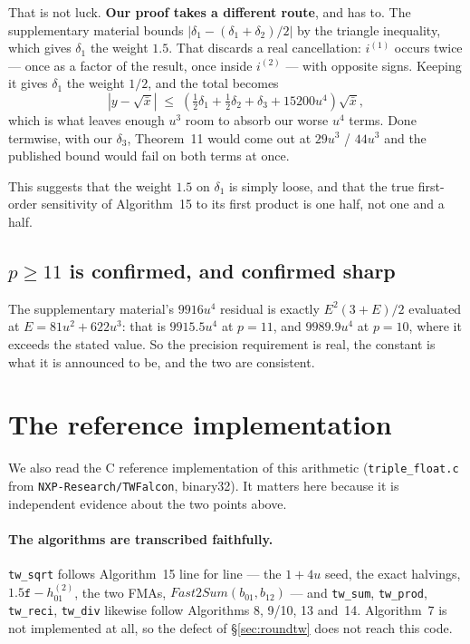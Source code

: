 \documentclass[11pt,a4paper]{article}
\newcommand{\alg}[1]{\mathit{#1}}
\begin{document}
That is not luck. \textbf{Our proof takes a different route}, and has to. The
supplementary material bounds $|\delta_1 - (\delta_1+\delta_2)/2|$ by the
triangle inequality, which gives $\delta_1$ the weight $1.5$. That discards a
real cancellation: $i^{(1)}$ occurs twice --- once as a factor of the result,
once inside $i^{(2)}$ --- with opposite signs. Keeping it gives $\delta_1$ the
weight $1/2$, and the total becomes
\[
  \left|y - \sqrt{\bar x}\right| \;\leq\;
  \left(\tfrac12\delta_1 + \tfrac12\delta_2 + \delta_3 + 15200u^4\right)
  \sqrt{\bar x},
\]
which is what leaves enough $u^3$ room to absorb our worse $u^4$ terms. Done
termwise, with our $\delta_3$, Theorem~11 would come out at $29u^3$ / $44u^3$
and the published bound would fail on both terms at once.

This suggests that the weight $1.5$ on $\delta_1$ is simply loose, and that the
true first-order sensitivity of Algorithm~15 to its first product is one half,
not one and a half.

\subsection{$p \geq 11$ is confirmed, and confirmed sharp}

The supplementary material's $9916u^4$ residual is exactly $E^2(3+E)/2$
evaluated at $E = 81u^2 + 622u^3$: that is $9915.5u^4$ at $p = 11$, and
$9989.9u^4$ at $p = 10$, where it exceeds the stated value. So the precision
requirement is real, the constant is what it is announced to be, and the two
are consistent.

\section{The reference implementation}\label{sec:impl}

We also read the C reference implementation of this arithmetic
(\texttt{triple\_float.c} from \texttt{NXP-Research/TWFalcon}, binary32). It
matters here because it is independent evidence about the two points above.

\paragraph{The algorithms are transcribed faithfully.}
\texttt{tw\_sqrt} follows Algorithm~15 line for line --- the $1+4u$ seed, the
exact halvings, $\mathtt{1.5f} - h_{01}^{(2)}$, the two FMAs,
$\alg{Fast2Sum}(b_{01}, b_{12})$ --- and \texttt{tw\_sum}, \texttt{tw\_prod},
\texttt{tw\_reci}, \texttt{tw\_div} likewise follow Algorithms 8, 9/10, 13
and~14. Algorithm~7 is not implemented at all, so the defect of
\S\ref{sec:roundtw} does not reach this code.
\end{document}
